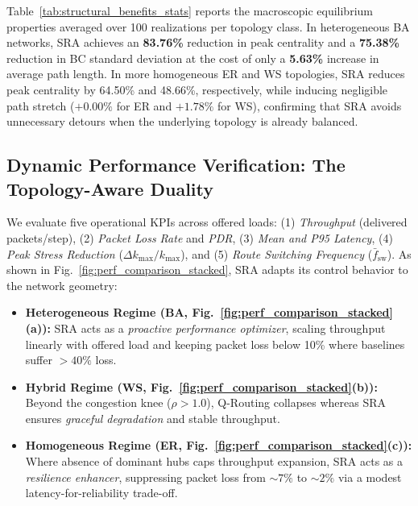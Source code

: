 \documentclass{ccjnl}
\newcommand{\rev}[1]{{\color{blue}#1}}
\def\rev#1{#1}%
\def\kappa{k}%
\begin{document}
Table~\ref{tab:structural_benefits_stats} reports the macroscopic equilibrium properties averaged over 100 realizations per topology class. In heterogeneous BA networks, SRA achieves an \textbf{83.76\%} reduction in peak centrality and a \textbf{75.38\%} reduction in BC standard deviation at the cost of only a \textbf{5.63\%} increase in average path length. In more homogeneous ER and WS topologies, SRA reduces peak centrality by 64.50\% and 48.66\%, respectively, while inducing negligible path stretch ($+0.00\%$ for ER and $+1.78\%$ for WS), confirming that SRA avoids unnecessary detours when the underlying topology is already balanced.

\subsection{Dynamic Performance Verification: The Topology-Aware Duality}
\label{subsec:dynamic_performance}

\rev{We evaluate five operational KPIs across offered loads: (1) \textit{Throughput} (delivered packets/step), (2) \textit{Packet Loss Rate} and \textit{PDR}, (3) \textit{Mean and P95 Latency}, (4) \textit{Peak Stress Reduction} ($\Delta \kappa_{\max}/\kappa_{\max}$), and (5) \textit{Route Switching Frequency} ($\bar{f}_{\text{sw}}$).} As shown in Fig.~\ref{fig:perf_comparison_stacked}, SRA adapts its control behavior to the network geometry:
\begin{itemize}
    \item \textbf{Heterogeneous Regime (BA, Fig.~\ref{fig:perf_comparison_stacked}(a)):} SRA acts as a \textit{proactive performance optimizer}, scaling throughput linearly with offered load and keeping packet loss below 10\% where baselines suffer $>40\%$ loss.
    \item \textbf{Hybrid Regime (WS, Fig.~\ref{fig:perf_comparison_stacked}(b)):} Beyond the congestion knee ($\rho > 1.0$), Q-Routing collapses whereas SRA ensures \textit{graceful degradation} and stable throughput.
    \item \textbf{Homogeneous Regime (ER, Fig.~\ref{fig:perf_comparison_stacked}(c)):} Where absence of dominant hubs caps throughput expansion, SRA acts as a \textit{resilience enhancer}, suppressing packet loss from $\sim 7\%$ to $\sim 2\%$ via a modest latency-for-reliability trade-off.
\end{itemize}
\end{document}
